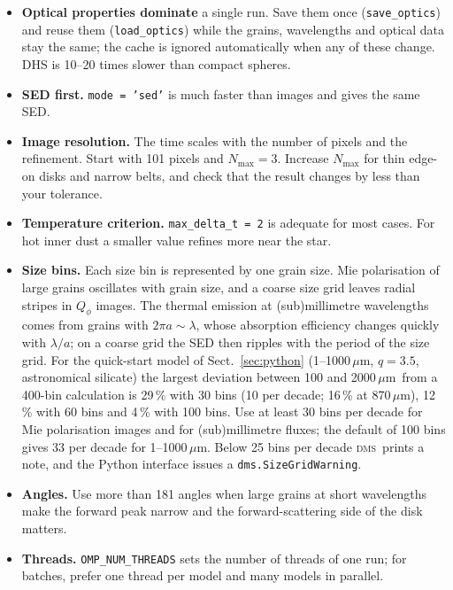 \documentclass[11pt,a4paper]{article}
\newcommand{\dms}{\textsc{dms}}
\newcommand{\code}[1]{\texttt{#1}}
\newcommand{\um}{\,$\mu$m}
\begin{document}
\begin{itemize}
\item \textbf{Optical properties dominate} a single run. Save them once (\code{save\_optics}) and
      reuse them (\code{load\_optics}) while the grains, wavelengths and optical data stay the
      same; the cache is ignored automatically when any of these change. DHS is 10--20 times
      slower than compact spheres.
\item \textbf{SED first.} \code{mode = 'sed'} is much faster than images and gives the same SED.
\item \textbf{Image resolution.} The time scales with the number of pixels and the refinement.
      Start with 101 pixels and $N_\mathrm{max}=3$. Increase $N_\mathrm{max}$ for thin edge-on disks
      and narrow belts, and check that the result changes by less than your tolerance.
\item \textbf{Temperature criterion.} \code{max\_delta\_t = 2} is adequate for most cases. For hot
      inner dust a smaller value refines more near the star.
\item \textbf{Size bins.} Each size bin is represented by one grain size. Mie polarisation of
      large grains oscillates with grain size, and a coarse size grid leaves radial stripes in
      $Q_\phi$ images. The thermal emission at (sub)millimetre wavelengths comes from grains with
      $2\pi a\sim\lambda$, whose absorption efficiency changes quickly with $\lambda/a$; on a
      coarse grid the SED then ripples with the period of the size grid. For the quick-start model
      of Sect.~\ref{sec:python} (1--1000\um, $q=3.5$, astronomical silicate) the largest deviation between 100 and 2000\um\ from a
      400-bin calculation is 29\,\% with 30 bins (10 per decade; 16\,\% at 870\um), 12\,\% with
      60 bins and 4\,\% with 100 bins. Use at least 30 bins per decade for Mie polarisation images
      and for (sub)millimetre fluxes; the default of 100 bins gives 33 per decade for 1--1000\um.
      Below 25 bins per decade \dms\ prints a note, and the Python interface issues a
      \code{dms.SizeGridWarning}.
\item \textbf{Angles.} Use more than 181 angles when large grains at short wavelengths make the
      forward peak narrow and the forward-scattering side of the disk matters.
\item \textbf{Threads.} \code{OMP\_NUM\_THREADS} sets the number of threads of one run; for batches,
      prefer one thread per model and many models in parallel.
\end{itemize}
\end{document}
